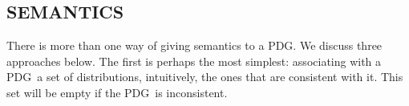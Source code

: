\documentclass{article}
\newcommand{\commentout}[1]{\ignorespaces}
\newcommand{\modelname}{probabilistic dependency graph}
\newcommand{\modelnames}{\modelname s}
\newcommand{\MN}{PDG}
\newcommand{\MNs}{\MN s}
\numberwithin{equation}{section}
\begin{document}
\begin{notfocus}
	\section{SEMANTICS}\label{sec:semantics}
	
        There is more than one way of giving semantics to
          a \MN.  We discuss three approaches below.
The first is perhaps the most simplest: associating
                    with a \MN\ a set of distributions, intuitively,
                    the ones that are consistent with it.
This set will be empty if the \MN\ is inconsistent.

\end{notfocus}
\end{document}
